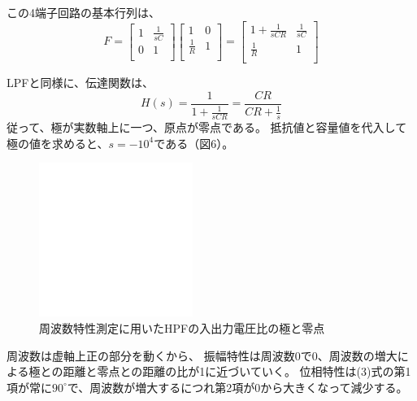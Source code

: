 \documentclass[10pt,a4j,dvipdfmx]{jsarticle}
\begin{document}
この4端子回路の基本行列は、
\begin{equation}
F =
\left[
\begin{array}{rr}
1 & \frac{1}{sC} \\
0 & 1 \\
\end{array}
\right]
\left[
\begin{array}{rr}
1 & 0 \\
\frac{1}{R} & 1 \\
\end{array}
\right]
=
\left[
\begin{array}{rr}
1+\frac{1}{sCR} & \frac{1}{sC} \\
\frac{1}{R} & 1 \\
\end{array}
\right]
\end{equation}

LPFと同様に、伝達関数は、
\begin{equation}
H\left(s\right) = \frac{1}{1+\frac{1}{sCR}} = \frac{CR}{CR+\frac{1}{s}}
\end{equation}
従って、極が実数軸上に一つ、原点が零点である。
抵抗値と容量値を代入して極の値を求めると、$s = -10^4$である（図6）。
\begin{figure}[H]
  \centering
  \includegraphics[width=5cm]{token.png}
  \caption{周波数特性測定に用いたHPFの入出力電圧比の極と零点}
\end{figure}

周波数は虚軸上正の部分を動くから、
振幅特性は周波数0で0、周波数の増大による極との距離と零点との距離の比が1に近づいていく。
位相特性は(3)式の第1項が常に$90^{\circ}$で、周波数が増大するにつれ第2項が0から大きくなって減少する。
\end{document}
